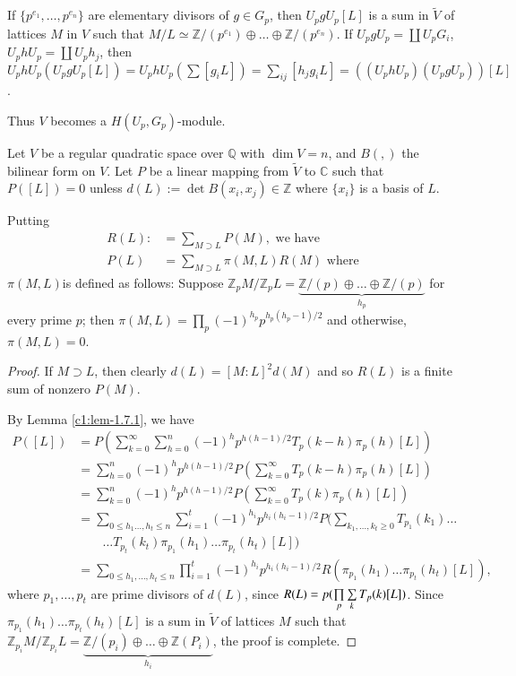 If $\{p^{e_{1}},\ldots,p^{e_{n}}\}$ are elementary divisors of $g\in
G_{p}$, then $U_{p}gU_{p}[L]$ is a sum in $\tilde{V}$ of lattices
$M$ in $V$ such that $M/L\simeq
\mathbb{Z}/(p^{e_{1}})\oplus\ldots\oplus\mathbb{Z}/(p^{e_{n}})$. If
$U_{p}gU_{p}=\coprod U_{p}G_{i}$, $U_{p}hU_{p}=\coprod U_{p}h_{j}$,
then $U_{p}hU_{p}(U_{p}gU_{p}[L])=U_{p}hU_{p}(\sum
[g_{i}L])=\sum_{ij}[h_{j}g_{i}L]=((U_{p}hU_{p})(U_{p}gU_{p}))[L]$. 

Thus $V$ becomes a $H(U_{p},G_{p})$-module.

\setcounter{subtheorem}{1}
\begin{subtheorem}\label{c1:thm-1.7.2}
Let $V$ be a regular quadratic space over $\mathbb{Q}$ with $\dim
V=n$, and $B(,)$ the bilinear form on $V$. Let $P$ be a linear mapping
from $\tilde{V}$ to $\mathbb{C}$ such that $P([L])=0$ unless
$d(L):=\det B(x_{i},x_{j})\in\mathbb{Z}$ where $\{x_{i}\}$ is a basis
of $L$.

Putting
\begin{align*}
R(L): &= \sum_{M\supset L}P(M), \text{  \  we have}\\
P(L) &=\sum_{M\supset L}\pi (M,L)R(M)\text{ \ where}
\end{align*}
$\pi(M,L)$\pageoriginale is defined as follows: Suppose
$\mathbb{Z}_{p}M/\mathbb{Z}_{p}L=\underbrace{\mathbb{Z}/(p)\oplus\ldots\oplus\mathbb{Z}/(p)}_{h_{p}}$
for every prime $p$; then
$\pi(M,L)=\prod\limits_{p}(-1)^{h_{p}}p^{h_{p}(h_{p}-1)/2}$ and
otherwise, $\pi(M,L)=0$. 
\end{subtheorem}

\begin{proof}
If $M\supset L$, then clearly $d(L)=[M:L]^{2}d(M)$ and so $R(L)$ is a
finite sum of nonzero $P(M)$.

By Lemma \ref{c1:lem-1.7.1}, we have
\begin{align*}
P([L]) &=
P(\sum^{\infty}_{k=0}\sum^{n}_{h=0}(-1)^{h}p^{h(h-1)/2}T_{p}(k-h)\pi_{p}(h)[L])\\
&=
\sum^{n}_{h=0}(-1)^{h}p^{h(h-1)/2}P(\sum^{\infty}_{k=0}T_{p}(k-h)\pi_{p}(h)[L])\\
&= \sum^{n}_{k=0}(-1)^{h}p^{h(h-1)/2}P(\sum^{\infty}_{k=0}T_{p}(k)\pi_{p}(h)[L])\\
&= \sum_{0\leq h_{1}\ldots,h_{t}\leq
  n}\sum^{t}_{i=1}(-1)^{h_{i}}p^{h_{i}(h_{i}-1)/2}P(\sum_{k_{1},\ldots,k_{t}\geq
  0}T_{p_{1}}(k_{1})\ldots\\
&\qquad \ldots T_{p_{t}}(k_{t})\pi_{p_{1}}(h_{1})\ldots
\pi_{p_{t}}(h_{t})[L])\\
&=\sum_{0\leq h_{1},\ldots,h_{t}\leq
  n}\prod^{t}_{i=1}(-1)^{h_{i}}p^{h_{i}(h_{i}-1)/2}R(\pi_{p_{1}}(h_{1})\ldots
\pi_{p_{t}}(h_{t})[L]), 
\end{align*}
where $p_{1},\ldots,p_{t}$ are prime divisors of $d(L)$, since
$R(L)=p(\prod\limits_{p}\sum\limits_{k}T_{p}(k)\break[L])$. Since
$\pi_{p_{1}}(h_{1})\ldots\pi_{p_{t}}(h_{t})[L]$ is a sum in\pageoriginale
$\tilde{V}$ of lattices $M$ such that
$\mathbb{Z}_{p_{i}}M/\mathbb{Z}_{p_{i}}L=\underbrace{\mathbb{Z}/(p_{i})\oplus\ldots\oplus
  \mathbb{Z}(P_{i})}_{h_{i}}$, the proof is complete.
\end{proof}

